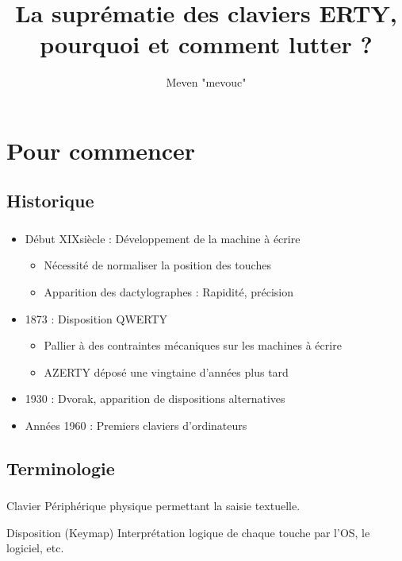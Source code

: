 \documentclass[c,12pt]{beamer}
\title{La suprématie des claviers ERTY, pourquoi et comment lutter ?}
\author{Meven "mevouc" \bsc{Courouble}}
\date{\oldstylenums{December 2015}}
\begin{document}
\frame{\titlepage}

\section{Pour commencer}
\subsection{Historique}

\begin{frame}
	\frametitle{\subsecname}
	\begin{itemize}
		\item<1-> Début XIX\ieme siècle : Développement de la machine à écrire
			\begin{itemize}
				\item<2-> Nécessité de normaliser la position des touches
				\item<3-> Apparition des dactylographes : Rapidité, précision
			\end{itemize}
		\item<4-> 1873 : Disposition QWERTY
			\begin{itemize}
				\item<5-> Pallier à des contraintes mécaniques sur les machines à écrire
				\item<6-> AZERTY déposé une vingtaine d'années plus tard
			\end{itemize}
		\item<7-> 1930 : Dvorak, apparition de dispositions alternatives
		\item Années 1960 : Premiers claviers d'ordinateurs
	\end{itemize}
\end{frame}

\subsection{Terminologie}

\begin{frame}
	\frametitle{\subsecname}
	\begin{block}{Clavier}
		Périphérique physique permettant la saisie textuelle.
	\end{block}
	\begin{block}{Disposition (Keymap)}
		Interprétation logique de chaque touche par l'OS, le logiciel, etc.
	\end{block}
\end{frame}
\end{document}
